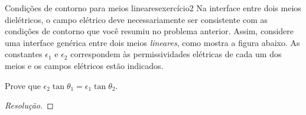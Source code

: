 \begin{exercício}{Condições de contorno para meios lineares}{exercício2}
    Na interface entre dois meios dielétricos, o campo elétrico deve necessariamente ser consistente com as condições de contorno que você resumiu no problema anterior. Assim, considere uma interface genérica entre dois meios \emph{lineares}, como mostra a figura abaixo. As constantes \(\epsilon_1\) e \(\epsilon_2\) correspondem às permissividades elétricas de cada um dos meios e os campos elétricos estão indicados.

    \begin{center}
    \end{center}

    Prove que \(\epsilon_2 \tan{\theta_1} = \epsilon_1 \tan{\theta_2}\).
\end{exercício}
\begin{proof}[Resolução]

\end{proof}
